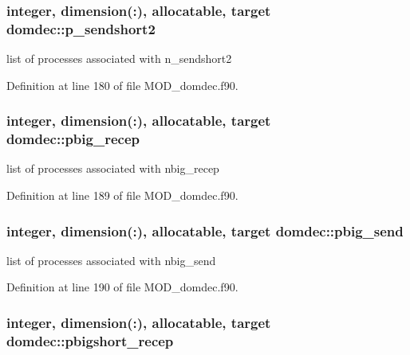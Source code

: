 \hypertarget{classdomdec_a4307c5b3e7ed134c6ff12f02074a1841}{
\subsubsection[{p\-\_\-sendshort2}]{\setlength{\rightskip}{0pt plus 5cm}integer, dimension(\-:), allocatable, target domdec\-::p\-\_\-sendshort2}}\label{classdomdec_a4307c5b3e7ed134c6ff12f02074a1841}


list of processes associated with n\-\_\-sendshort2 



Definition at line 180 of file M\-O\-D\-\_\-domdec.\-f90.

\hypertarget{classdomdec_a2d8dc7137683aeffdb639b128de9a68a}{
\subsubsection[{pbig\-\_\-recep}]{\setlength{\rightskip}{0pt plus 5cm}integer, dimension(\-:), allocatable, target domdec\-::pbig\-\_\-recep}}\label{classdomdec_a2d8dc7137683aeffdb639b128de9a68a}


list of processes associated with nbig\-\_\-recep 



Definition at line 189 of file M\-O\-D\-\_\-domdec.\-f90.

\hypertarget{classdomdec_acb406c89cb7b4240f2e81ba5ecbed7e2}{
\subsubsection[{pbig\-\_\-send}]{\setlength{\rightskip}{0pt plus 5cm}integer, dimension(\-:), allocatable, target domdec\-::pbig\-\_\-send}}\label{classdomdec_acb406c89cb7b4240f2e81ba5ecbed7e2}


list of processes associated with nbig\-\_\-send 



Definition at line 190 of file M\-O\-D\-\_\-domdec.\-f90.

\hypertarget{classdomdec_a588c3664b18e8576817604627f1b8aef}{
\subsubsection[{pbigshort\-\_\-recep}]{\setlength{\rightskip}{0pt plus 5cm}integer, dimension(\-:), allocatable, target domdec\-::pbigshort\-\_\-recep}}\label{classdomdec_a588c3664b18e8576817604627f1b8aef}



